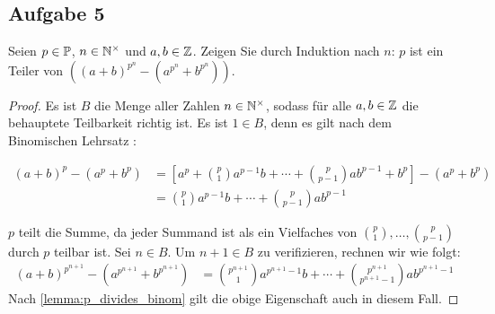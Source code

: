 \subsection{Aufgabe 5}
Seien $p \in \mathbb{P}{}$, $n \in \mathbb{N}^\times{}$ und $a,b \in \mathbb{Z}{}$. Zeigen Sie durch Induktion
nach $n$: $p$ ist ein Teiler von
$((a + b)^{p^n} - (a^{p^n} + b^{p^n}))$.
\begin{proof}
  Es ist $B$ die Menge aller Zahlen $n \in \mathbb{N}^\times{}$,
  sodass für alle $a,b \in \mathbb{Z}{}$ die behauptete Teilbarkeit richtig ist.
  Es ist $1 \in B$, denn es gilt nach dem Binomischen Lehrsatz
  \parencite[19]{book:zahlentheorie}:
  \begin{widemath}
    \begin{equation*}
      \begin{aligned}
        (a + b)^p - (a^p + b^p) & =
        \left[a^p + \binom{p}{1}a^{p-1}b + \dotsb + \binom{p}{p - 1}ab^{p-1} + b^p\right] - (a^p + b^p) \\
                                & = \binom{p}{1}a^{p-1}b + \dotsb + \binom{p}{p - 1}ab^{p-1}
      \end{aligned}
    \end{equation*}
  \end{widemath}
  $p$ teilt die Summe, da jeder Summand ist als ein Vielfaches
  von $\binom{p}{1},\dotsc,\binom{p}{p - 1}$ durch $p$ teilbar ist.
  Sei $n \in B$. Um $n + 1 \in B$ zu verifizieren, rechnen wir wie folgt:
  \begin{equation*}
    \begin{aligned}
      (a + b)^{p^{n+1}} - (a^{p^{n+1}} + b^{p^{n+1}}) & =
      \binom{p^{n+1}}{1}a^{p^{n+1}-1}b + \dotsb + \binom{p^{n+1}}{p^{n+1} - 1}ab^{p^{n+1}-1}
    \end{aligned}
  \end{equation*}
  Nach \autoref{lemma:p_divides_binom} gilt die obige Eigenschaft auch in diesem Fall.
\end{proof}

\newpage
